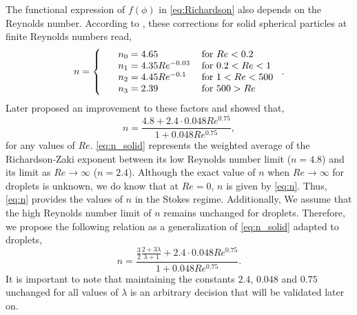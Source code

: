 The functional expression of $f(\phi)$ in \ref{eq:Richardson} also depends on the Reynolds number. 
According to \citet{richardson1997sedimentation}, these corrections for solid spherical particles at finite Reynolds numbers read, 
\begin{equation}
    n = \left\{
        \begin{tabular}{lll}
            &$n_0 =4.65$ & for $Re<0.2$\\ 
            &$n_1 = 4.35 Re^{-0.03}$ & for $0.2<Re<1$\\ 
            &$n_2 = 4.45 Re^{-0.1}$ & for $1<Re<500$\\ 
            &$n_3 = 2.39$ & for $500>Re$\\ 
        \end{tabular}
    \right. . 
    \label{eq:n_jackson}
\end{equation}
Later \citet{kramer2019improvement} proposed an improvement to these factors and showed that, 
\begin{equation}
    n = \frac{4.8 + 2.4 \cdot 0.048 Re^{0.75}}{1+0.048 Re^{0.75}},
    \label{eq:n_solid}
\end{equation} 
for any values of $Re$. 
\ref{eq:n_solid} represents the weighted average of the Richardson-Zaki exponent between its low Reynolds number limit ($n=4.8$) and its limit as $Re \to \infty$ ($n = 2.4$).  
Although the exact value of $n$ when $Re\to\infty$ for droplets is unknown, we do know that at $Re = 0$, $n$ is given by \ref{eq:n}. 
Thus, \ref{eq:n} provides the values of $n$ in the Stokes regime.
Additionally, We assume that the high Reynolds number limit of $n$ remains unchanged for droplets. 
Therefore, we propose the following relation as a generalization of \ref{eq:n_solid} adapted to droplets, 
\begin{equation}
    n = \frac{\frac{3}{2} \frac{2+3\lambda}{\lambda+1} + 2.4 \cdot 0.048 Re^{0.75}}{1+0.048 Re^{0.75}}. 
    \label{eq:final_n}
\end{equation} 
It is important to note that maintaining the constants $2.4$, $0.048$ and $0.75$ unchanged for all values of  $\lambda$ is an arbitrary decision that will be validated later on. 


